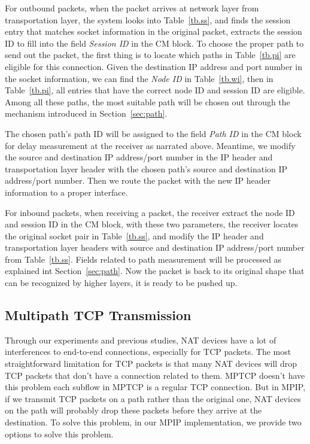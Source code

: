For outbound packets, when the packet arrives at network layer from transportation layer, the system looks into Table~\ref{tb.ss}, and finds the session entry that matches socket information in the original packet, extracts the session ID to fill into the field \emph{Session ID} in the CM block. To choose the proper path to send out the packet, the first thing is to locate which paths in Table~\ref{tb.pi} are eligible for this connection. Given the destination IP address and port number in the socket information, we can find the \emph{Node ID} in Table~\ref{tb.wi}, then in Table~\ref{tb.pi}, all entries that have the correct node ID and session ID are eligible. Among all these paths, the most suitable path will be chosen out through the mechanism introduced in Section~\ref{sec:path}. 

The chosen path's path ID will be assigned to the field \emph{Path ID} in the CM block for delay measurement at the receiver as narrated above. Meantime, we modify the source and destination IP address/port number in the IP header and transportation layer header with the chosen path's source and destination IP address/port number. Then we route the packet with the new IP header information to a proper interface.

For inbound packets, when receiving a packet, the receiver extract the node ID and session ID in the CM block, with these two parameters, the receiver locates the original socket pair in Table~\ref{tb.ss}, and modify the IP header and transportation layer headers with source and destination IP address/port number from Table~\ref{tb.ss}. Fields related to path measurement will be processed as explained int Section~\ref{sec:path}. Now the packet is back to its original shape that can be recognized by higher layers, it is ready to be pushed up.


%

\subsection{Multipath TCP Transmission}
\label{sec:tcp}
Through our experiments and previous studies\cite{mptcp}, NAT devices have a lot of interferences to end-to-end connections, especially for TCP packets. The most straightforward limitation for TCP packets is that many NAT devices will drop TCP packets that don't have a connection related to them. MPTCP doesn't have this problem each subflow in MPTCP is a regular TCP connection. But in MPIP, if we transmit TCP packets on a path rather than the original one, NAT devices on the path will probably drop these packets before they arrive at the destination. To solve this problem, in our MPIP implementation, we provide two options to solve this problem.

